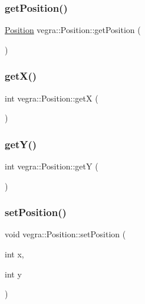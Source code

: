 \subsubsection{\texorpdfstring{get\+Position()}{getPosition()}}
{\footnotesize\ttfamily \mbox{\hyperlink{structvegra_1_1Position}{Position}} vegra\+::\+Position\+::get\+Position (\begin{DoxyParamCaption}{ }\end{DoxyParamCaption})\hspace{0.3cm}{\ttfamily [inline]}}

\mbox{\label{structvegra_1_1Position_a5c93cf166315938b531e879ad31cddd1}} 
\subsubsection{\texorpdfstring{get\+X()}{getX()}}
{\footnotesize\ttfamily int vegra\+::\+Position\+::getX (\begin{DoxyParamCaption}{ }\end{DoxyParamCaption})\hspace{0.3cm}{\ttfamily [inline]}}

\mbox{\label{structvegra_1_1Position_a4580e90a19e9b28d4abc6a67326dce7a}} 
\subsubsection{\texorpdfstring{get\+Y()}{getY()}}
{\footnotesize\ttfamily int vegra\+::\+Position\+::getY (\begin{DoxyParamCaption}{ }\end{DoxyParamCaption})\hspace{0.3cm}{\ttfamily [inline]}}

\mbox{\label{structvegra_1_1Position_a6f5f33e280592cce1670b9558d24d8a8}} 
\subsubsection{\texorpdfstring{set\+Position()}{setPosition()}}
{\footnotesize\ttfamily void vegra\+::\+Position\+::set\+Position (\begin{DoxyParamCaption}\item[{int}]{x,  }\item[{int}]{y }\end{DoxyParamCaption})\hspace{0.3cm}{\ttfamily [inline]}}

